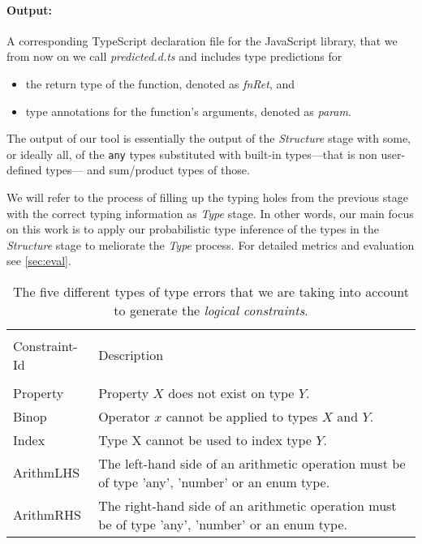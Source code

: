 \documentclass[sigplan,10pt,anonymous]{acmart} %
\theoremstyle{plain}
\theoremstyle{remark}
\theoremstyle{definition}
\begin{document}
\paragraph{Output:} A corresponding TypeScript declaration file for the
JavaScript library, that we from now on we call \textit{predicted.d.ts} and
includes type predictions for
\begin{itemize}[label=\raisebox{0.25ex}{\tiny$\bullet$}]
  \item the return type of the function, denoted as \emph{fnRet}, and
  \item type annotations for the function's arguments, denoted as \emph{param}.
\end{itemize}
The output of our tool is essentially the output of the \textit{Structure} stage with some, or ideally all, of the \texttt{any} types substituted with built-in types---that is non user-defined types--- and sum/product types of those.

We will refer to the process of filling up the typing holes from the previous stage with the correct typing information as \textit{Type} stage.  In other words, our main focus on this work is to apply our probabilistic
type inference of the types in the \textit{Structure} stage to meliorate the \textit{Type}
process. For detailed metrics and evaluation see
\cref{sec:eval}.

\begin{table*}[t]
  \centering
  \caption{The five different types of type errors that we are taking into account to generate the \textit{logical constraints}.}\label{tab:constraints}
  \begin{tabularx}{\textwidth}{lX}
    \toprule                                                               \\
    Constraint-Id & Description                                            \\
    \midrule                                                               \\
    Property      & Property $X$ does not exist on type $Y$.               \\
    Binop         & Operator $x$ cannot be applied
    to types $X$ and $Y$.                                                  \\
    Index         & Type X cannot be used to index type $Y$.               \\
    ArithmLHS     & The left-hand side of an arithmetic operation must be
    of type 'any', 'number' or an enum type.                               \\
    ArithmRHS     & The right-hand side of an arithmetic operation must be
    of type 'any', 'number' or an enum type.                               \\
    \bottomrule
  \end{tabularx}
\end{table*}
\end{document}
